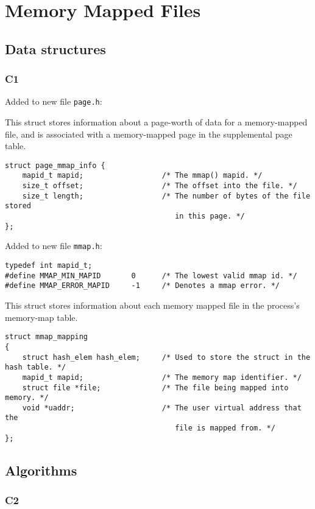 \documentclass[a4wide, 11pt]{article}
\newcommand{\tx}{\texttt}
\begin{document}
\section{Memory Mapped Files}
\subsection{Data structures}
\subsubsection{C1}
Added to new file \tx{page.h}:

This struct stores information about a page-worth of data for a memory-mapped file, and is associated with a memory-mapped page in the supplemental page table.
\begin{verbatim}
struct page_mmap_info {
    mapid_t mapid;                  /* The mmap() mapid. */
    size_t offset;                  /* The offset into the file. */
    size_t length;                  /* The number of bytes of the file stored
                                       in this page. */
};
\end{verbatim}

Added to new file \tx{mmap.h}:
\begin{verbatim}
typedef int mapid_t;
#define MMAP_MIN_MAPID       0      /* The lowest valid mmap id. */
#define MMAP_ERROR_MAPID     -1     /* Denotes a mmap error. */
\end{verbatim}

This struct stores information about each memory mapped file in the process's memory-map table.
\begin{verbatim}
struct mmap_mapping
{
    struct hash_elem hash_elem;     /* Used to store the struct in the hash table. */
    mapid_t mapid;                  /* The memory map identifier. */
    struct file *file;              /* The file being mapped into memory. */
    void *uaddr;                    /* The user virtual address that the
                                       file is mapped from. */
};
\end{verbatim}

\subsection{Algorithms}
\subsubsection{C2}
\end{document}

